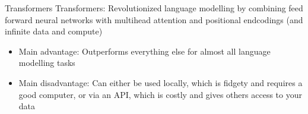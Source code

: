 \documentclass[10pt]{beamer}
\begin{document}
    \begin{frame}{Transformers}
        Transformers: Revolutionized language modelling by combining feed forward neural networks with multihead attention and positional endcodings (and infinite data and compute)
            \begin{itemize}
                \item Main advantage: Outperforms everything else for almost all language modelling tasks
                \item Main disadvantage: Can either be used locally, which is fidgety and requires a good computer, or via an API, which is costly and gives others access to your data
            \end{itemize}
    \end{frame}
\end{document}
